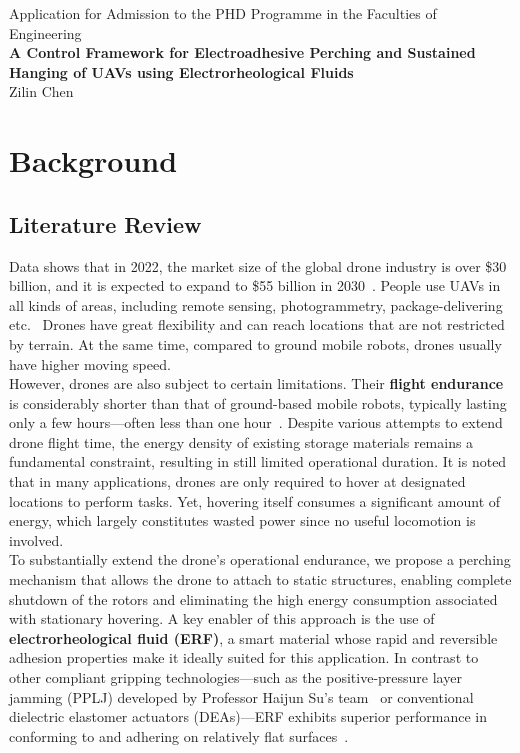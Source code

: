 \documentclass[11pt,a4paper]{article}
\begin{document}
\begin{center}
    \normalsize{Application for Admission to the PHD Programme in the Faculties of Engineering}\\
    \textbf{\Large{A Control Framework for Electroadhesive Perching and Sustained Hanging of UAVs using Electrorheological Fluids}}\\
    \normalsize{Zilin Chen}
\end{center}

\section{Background}
\subsection{Literature Review}
Data shows that in 2022, the market size of the global drone industry is over \$30 billion, and it is expected to expand to \$55 billion in 2030~\cite{nonami2025overview}. People use UAVs in all kinds of areas, including remote sensing, photogrammetry, package-delivering etc.~\cite{COLOMINA201479} Drones have great flexibility and can reach locations that are not restricted by terrain. At the same time, compared to ground mobile robots, drones usually have higher moving speed.\\
However, drones are also subject to certain limitations. Their \textbf{flight endurance} is considerably shorter than that of ground-based mobile robots, typically lasting only a few hours—often less than one hour~\cite{kim2018drone}. Despite various attempts to extend drone flight time, the energy density of existing storage materials remains a fundamental constraint, resulting in still limited operational duration. It is noted that in many applications, drones are only required to hover at designated locations to perform tasks. Yet, hovering itself consumes a significant amount of energy, which largely constitutes wasted power since no useful locomotion is involved.\\
To substantially extend the drone’s operational endurance, we propose a perching mechanism that allows the drone to attach to static structures, enabling complete shutdown of the rotors and eliminating the high energy consumption associated with stationary hovering. A key enabler of this approach is the use of \textbf{electrorheological fluid (ERF)}, a smart material whose rapid and reversible adhesion properties make it ideally suited for this application. In contrast to other compliant gripping technologies—such as the positive-pressure layer jamming (PPLJ) developed by Professor Haijun Su’s team~\cite{crowley20223d} or conventional dielectric elastomer actuators (DEAs)—ERF exhibits superior performance in conforming to and adhering on relatively flat surfaces~\cite{o2008review}.\\
\end{document}

